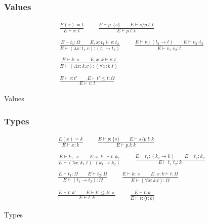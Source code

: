 \documentclass[twoside]{article}
\begin{document}
\subsubsection*{Values \hfill
{}
}

\begin{displaymath}
\begin{array}{c}
\displaystyle
\frac{
E(x) = t
}{
E \vdash x : t
}
\qquad
\frac{
E \vdash p : \{s\}
\qquad
E \vdash s/p.l : t
}{
E \vdash p.l : t
}
\\\\\displaystyle
\frac{
E \vdash t_1 : \Omega
\qquad
E,x:t_1 \vdash v : t_2
}{
E \vdash (\lambda x:t_1.v) : (t_1\to t_2)
}
\qquad
\frac{
E \vdash v_1 : (t_2\to t)
\qquad
E \vdash v_2 : t_2
}{
E \vdash v_1\;v_2 : t
}
\\\\\displaystyle
\frac{
E \vdash k : \diamond
\qquad
E,x:k \vdash v : t
}{
E \vdash (\Lambda x:k.v) : (\forall x:k.t)
}
\\\\\displaystyle
\frac{
E \vdash v : t'
\qquad
E \vdash t' \leq t : \Omega
}{
E \vdash v : t
}
\end{array}
\end{displaymath}
\begin{center}Values\end{center}



\subsubsection*{Types \hfill
{}
}

\begin{displaymath}
\begin{array}{c}
\displaystyle
\frac{
E(x) = k
}{
E \vdash x : k
}
\qquad
\frac{
E \vdash p : \{s\}
\qquad
E \vdash s/p.l : k
}{
E \vdash p.l : k
}
\\\\\displaystyle
\frac{
E \vdash k_1 : \diamond
\qquad
E,x:k_1 \vdash t : k_2
}{
E \vdash (\lambda x:k_1.t) : (k_1\to k_2)
}
\qquad
\frac{
E \vdash t_1 : (k_2\to k)
\qquad
E \vdash t_2 : k_2
}{
E \vdash t_1\;t_2 : k
}
\\\\\displaystyle
\frac{
E \vdash t_1 : \Omega
\qquad
E \vdash t_2 : \Omega
}{
E \vdash (t_1\to t_2) : \Omega
}
\qquad
\frac{
E \vdash k : \diamond
\qquad
E,x:k \vdash t : \Omega
}{
E \vdash (\forall x:k.t) : \Omega
}
\\\\\displaystyle
\frac{
E \vdash t : k'
\qquad
E \vdash k' \leq k : \diamond
}{
E \vdash t : k
}
\qquad
\frac{
E \vdash t : k
}{
E \vdash t : \langle t:k\rangle
}
\end{array}
\end{displaymath}
\begin{center}Types\end{center}
\end{document}
